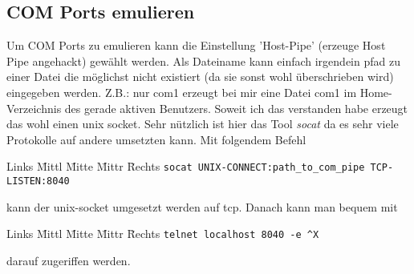 \documentclass[12pt]{article}
\newenvironment{code}{\begin{tabbing}Links \= Mittl \= Mitte \= Mittr \= Rechts \kill}{\end{tabbing}}
\begin{document}
\subsection{COM Ports emulieren}
Um COM Ports zu emulieren kann die Einstellung 'Host-Pipe' (erzeuge Host Pipe angehackt)
gewählt werden. Als Dateiname kann einfach irgendein pfad zu einer Datei die möglichst nicht
existiert (da sie sonst wohl überschrieben wird) eingegeben werden.
Z.B.: nur com1 erzeugt bei mir eine Datei com1 im Home-Verzeichnis des gerade aktiven Benutzers.
Soweit ich das verstanden habe erzeugt das wohl einen unix socket. Sehr nützlich ist hier das Tool
\textit{socat} da es sehr viele Protokolle auf andere umsetzten kann. Mit folgendem Befehl
\begin{code}
	\> \verb#socat UNIX-CONNECT:path_to_com_pipe TCP-LISTEN:8040#
\end{code}
kann der unix-socket umgesetzt werden auf tcp. Danach kann man bequem mit
\begin{code}
	\> \verb#telnet localhost 8040 -e ^X#
\end{code}
darauf zugeriffen werden.
\end{document}
